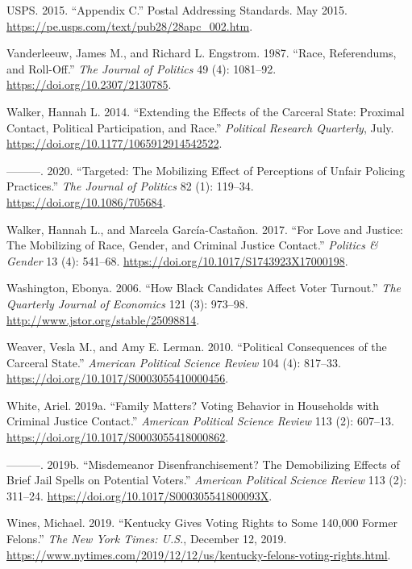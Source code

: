 \documentclass[
  12pt,
]{article}
\newlength{\cslhangindent}
\newenvironment{cslreferences}%
  {\setlength{\parindent}{0pt}%
  \everypar{\setlength{\hangindent}{\cslhangindent}}\ignorespaces}%
  {\par}
\begin{document}
\begin{cslreferences}
\leavevmode\hypertarget{ref-USPS2015}{}%
USPS. 2015. ``Appendix C.'' Postal Addressing Standards. May 2015. \url{https://pe.usps.com/text/pub28/28apc_002.htm}.

\leavevmode\hypertarget{ref-Vanderleeuw1987}{}%
Vanderleeuw, James M., and Richard L. Engstrom. 1987. ``Race, Referendums, and Roll-Off.'' \emph{The Journal of Politics} 49 (4): 1081--92. \url{https://doi.org/10.2307/2130785}.

\leavevmode\hypertarget{ref-Walker2014}{}%
Walker, Hannah L. 2014. ``Extending the Effects of the Carceral State: Proximal Contact, Political Participation, and Race.'' \emph{Political Research Quarterly}, July. \url{https://doi.org/10.1177/1065912914542522}.

\leavevmode\hypertarget{ref-Walker2020}{}%
---------. 2020. ``Targeted: The Mobilizing Effect of Perceptions of Unfair Policing Practices.'' \emph{The Journal of Politics} 82 (1): 119--34. \url{https://doi.org/10.1086/705684}.

\leavevmode\hypertarget{ref-Walker2017}{}%
Walker, Hannah L., and Marcela García-Castañon. 2017. ``For Love and Justice: The Mobilizing of Race, Gender, and Criminal Justice Contact.'' \emph{Politics \& Gender} 13 (4): 541--68. \url{https://doi.org/10.1017/S1743923X17000198}.

\leavevmode\hypertarget{ref-Washington2006}{}%
Washington, Ebonya. 2006. ``How Black Candidates Affect Voter Turnout.'' \emph{The Quarterly Journal of Economics} 121 (3): 973--98. \url{http://www.jstor.org/stable/25098814}.

\leavevmode\hypertarget{ref-Weaver2010}{}%
Weaver, Vesla M., and Amy E. Lerman. 2010. ``Political Consequences of the Carceral State.'' \emph{American Political Science Review} 104 (4): 817--33. \url{https://doi.org/10.1017/S0003055410000456}.

\leavevmode\hypertarget{ref-White2019a}{}%
White, Ariel. 2019a. ``Family Matters? Voting Behavior in Households with Criminal Justice Contact.'' \emph{American Political Science Review} 113 (2): 607--13. \url{https://doi.org/10.1017/S0003055418000862}.

\leavevmode\hypertarget{ref-White2019}{}%
---------. 2019b. ``Misdemeanor Disenfranchisement? The Demobilizing Effects of Brief Jail Spells on Potential Voters.'' \emph{American Political Science Review} 113 (2): 311--24. \url{https://doi.org/10.1017/S000305541800093X}.

\leavevmode\hypertarget{ref-Wines2019}{}%
Wines, Michael. 2019. ``Kentucky Gives Voting Rights to Some 140,000 Former Felons.'' \emph{The New York Times: U.S.}, December 12, 2019. \url{https://www.nytimes.com/2019/12/12/us/kentucky-felons-voting-rights.html}.
\end{cslreferences}
\end{document}
